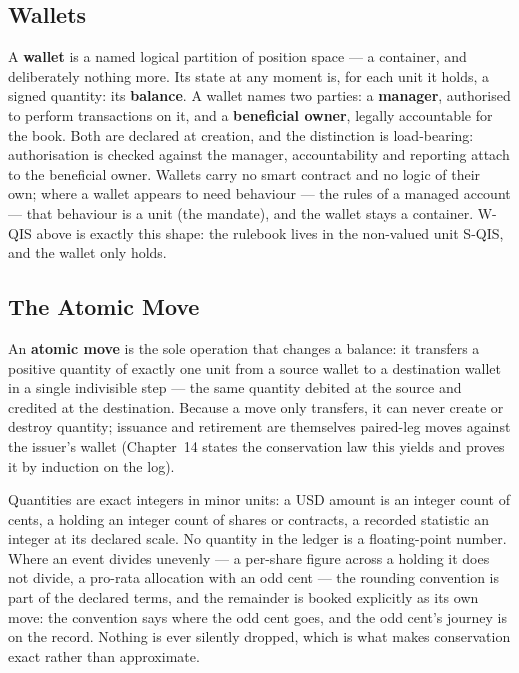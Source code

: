 \documentclass[11pt,a4paper]{article}
\begin{document}
\subsection{Wallets}

A \textbf{wallet} is a named logical partition of position space --- a container, and
deliberately nothing more. Its state at any moment is, for each unit it holds, a signed
quantity: its \textbf{balance}. A wallet names two parties: a \textbf{manager},
authorised to perform transactions on it, and a \textbf{beneficial owner}, legally
accountable for the book. Both are declared at creation, and the distinction is
load-bearing: authorisation is checked against the manager, accountability and reporting
attach to the beneficial owner. Wallets carry no smart contract and no logic of their
own; where a wallet appears to need behaviour --- the rules of a managed account ---
that behaviour is a unit (the mandate), and the wallet stays a container. W-QIS above is
exactly this shape: the rulebook lives in the non-valued unit S-QIS, and the wallet only
holds.

\subsection{The Atomic Move}

An \textbf{atomic move} is the sole operation that changes a balance: it transfers a
positive quantity of exactly one unit from a source wallet to a destination wallet in a
single indivisible step --- the same quantity debited at the source and credited at the
destination. Because a move only transfers, it can never create or destroy quantity;
issuance and retirement are themselves paired-leg moves against the issuer's wallet
(Chapter~14 states the conservation law this yields and proves it by induction on the
log).

Quantities are exact integers in minor units: a USD amount is an integer count of cents,
a holding an integer count of shares or contracts, a recorded statistic an integer at
its declared scale. No quantity in the ledger is a floating-point number. Where an event
divides unevenly --- a per-share figure across a holding it does not divide, a pro-rata
allocation with an odd cent --- the rounding convention is part of the declared terms,
and the remainder is booked explicitly as its own move: the convention says where the
odd cent goes, and the odd cent's journey is on the record. Nothing is ever silently
dropped, which is what makes conservation exact rather than approximate.
\end{document}
